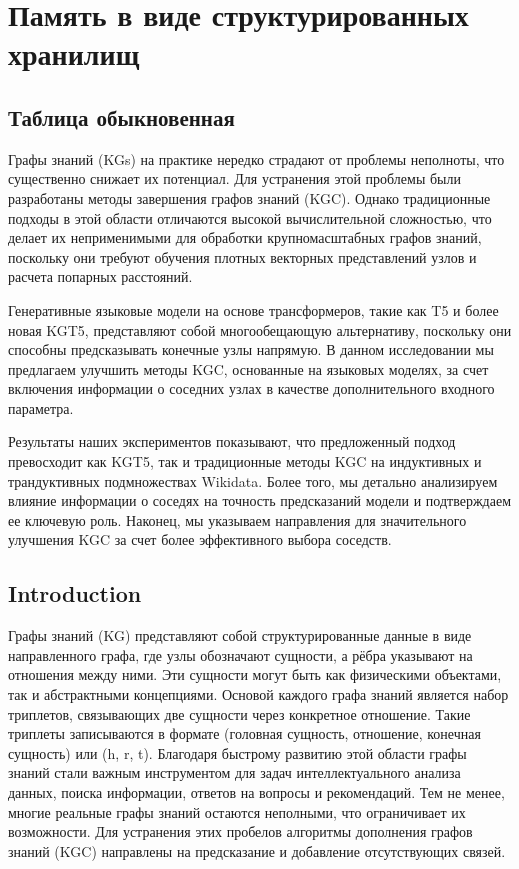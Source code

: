 \chapter{Память в виде структурированных хранилищ}\label{ch:ch6}


\newcommand{\up}{\textcolor{green}{$\uparrow$}}
\newcommand{\down}{\textcolor{red}{$\downarrow$}}

\section{Таблица обыкновенная}\label{sec:ch6/sect1}

Графы знаний (KGs) на практике нередко страдают от проблемы неполноты, что существенно снижает их потенциал. Для устранения этой проблемы были разработаны методы завершения графов знаний (KGC). Однако традиционные подходы в этой области отличаются высокой вычислительной сложностью, что делает их неприменимыми для обработки крупномасштабных графов знаний, поскольку они требуют обучения плотных векторных представлений узлов и расчета попарных расстояний.

Генеративные языковые модели на основе трансформеров, такие как T5 и более новая KGT5, представляют собой многообещающую альтернативу, поскольку они способны предсказывать конечные узлы напрямую. В данном исследовании мы предлагаем улучшить методы KGC, основанные на языковых моделях, за счет включения информации о соседних узлах в качестве дополнительного входного параметра.

Результаты наших экспериментов показывают, что предложенный подход превосходит как KGT5, так и традиционные методы KGC на индуктивных и трандуктивных подмножествах Wikidata. Более того, мы детально анализируем влияние информации о соседях на точность предсказаний модели и подтверждаем ее ключевую роль. Наконец, мы указываем направления для значительного улучшения KGC за счет более эффективного выбора соседств.

\section{Introduction}


Графы знаний (KG) представляют собой структурированные данные в виде направленного графа, где узлы обозначают сущности, а рёбра указывают на отношения между ними. Эти сущности могут быть как физическими объектами, так и абстрактными концепциями. Основой каждого графа знаний является набор триплетов, связывающих две сущности через конкретное отношение. Такие триплеты записываются в формате (головная сущность, отношение, конечная сущность) или (h, r, t). Благодаря быстрому развитию этой области графы знаний стали важным инструментом для задач интеллектуального анализа данных, поиска информации, ответов на вопросы и рекомендаций. Тем не менее, многие реальные графы знаний остаются неполными, что ограничивает их возможности. Для устранения этих пробелов алгоритмы дополнения графов знаний (KGC) направлены на предсказание и добавление отсутствующих связей.


